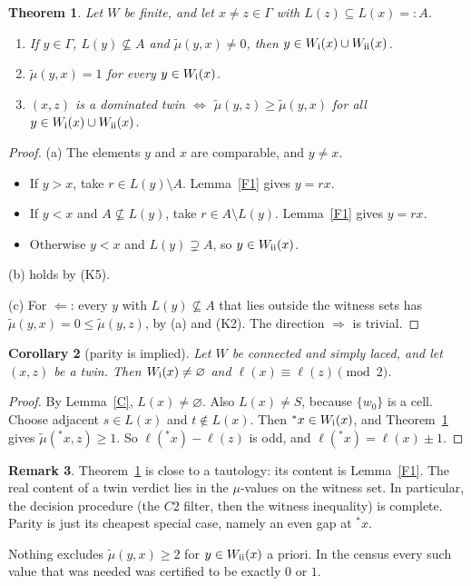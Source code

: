 \documentclass[11pt]{amsart}
\newcommand{\tmu}{\tilde\mu}
\theoremstyle{plain}
\newtheorem{theorem}{Theorem}
\newtheorem{corollary}[theorem]{Corollary}
\theoremstyle{definition}
\newtheorem{remark}[theorem]{Remark}
\begin{document}
\begin{theorem}\label{thm:W}
Let $W$ be finite, and let $x\ne z\in\Gamma$ with $L(z)\subseteq L(x)=:A$.
\begin{enumerate}[label=(\alph*),itemsep=0pt]
\item If $y\in\Gamma$, $L(y)\not\subseteq A$ and $\tmu(y,x)\neq0$, then $y\in W_{\rm i}(x)\cup W_{\rm ii}(x)$.
\item $\tmu(y,x)=1$ for every $y\in W_{\rm i}(x)$.
\item $(x,z)$ is a dominated twin $\iff$ $\tmu(y,z)\ge\tmu(y,x)$ for all $y\in W_{\rm i}(x)\cup W_{\rm ii}(x)$.
\end{enumerate}
\end{theorem}
\begin{proof}
(a) The elements $y$ and $x$ are comparable, and $y\ne x$.
\begin{itemize}[leftmargin=*,itemsep=0pt]
\item If $y>x$, take $r\in L(y)\setminus A$. Lemma~\ref{F1} gives $y=rx$.
\item If $y<x$ and $A\not\subseteq L(y)$, take $r\in A\setminus L(y)$. Lemma~\ref{F1} gives $y=rx$.
\item Otherwise $y<x$ and $L(y)\supsetneq A$, so $y\in W_{\rm ii}(x)$.
\end{itemize}
(b) holds by (K5).

(c) For $\Leftarrow$: every $y$ with $L(y)\not\subseteq A$ that lies outside the witness sets has $\tmu(y,x)=0\le\tmu(y,z)$, by (a) and (K2). The direction $\Rightarrow$ is trivial.
\end{proof}

\begin{corollary}[parity is implied]\label{cor:P}
Let $W$ be connected and simply laced, and let $(x,z)$ be a twin. Then $W_{\rm i}(x)\neq\varnothing$ and $\ell(x)\equiv\ell(z)\pmod 2$.
\end{corollary}
\begin{proof}
By Lemma~\ref{C}, $L(x)\neq\varnothing$. Also $L(x)\ne S$, because $\{w_0\}$ is a cell. Choose adjacent $s\in L(x)$ and $t\notin L(x)$. Then ${}^*x\in W_{\rm i}(x)$, and Theorem~\ref{thm:W} gives $\tmu({}^*x,z)\ge1$. So $\ell({}^*x)-\ell(z)$ is odd, and $\ell({}^*x)=\ell(x)\pm1$.
\end{proof}

\begin{remark}
Theorem~\ref{thm:W} is close to a tautology: its content is Lemma~\ref{F1}. The real content of a twin verdict lies in the $\mu$-values on the witness set. In particular, the decision procedure (the $C2$ filter, then the witness inequality) is complete. Parity is just its cheapest special case, namely an even gap at ${}^*x$.

Nothing excludes $\tmu(y,x)\ge2$ for $y\in W_{\rm ii}(x)$ a priori. In the census every such value that was needed was certified to be exactly $0$ or $1$.
\end{remark}
\end{document}
